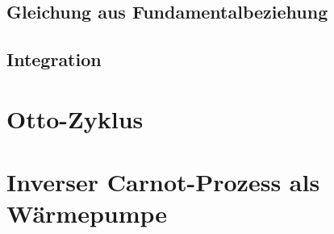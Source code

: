 \subsection{Gleichung aus Fundamentalbeziehung}

\subsection{Integration}

\section{Otto-Zyklus}

\section{Inverser Carnot-Prozess als Wärmepumpe}

\subsection{}

\subsection{}



